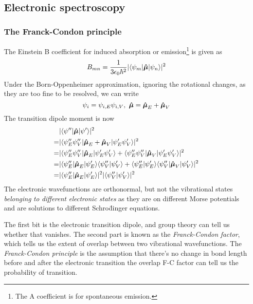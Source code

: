 \subsection{Electronic spectroscopy}

\subsubsection{The Franck-Condon principle}
The Einstein B coefficient for induced absorption or emission\footnote{The A coefficient is for spontaneous emission.} is given as 
\begin{equation}
\label{einsteincoeff}
	B_{mn}=\frac{1}{3\epsilon_0\hbar^2}|\langle \psi_m |\boldsymbol{\hat{\mu}}|\psi_n  \rangle|^2
\end{equation}
Under the Born-Oppenheimer approximation, ignoring the rotational changes, as they are too fine to be resolved, we can write
\begin{equation}
	\psi_i=\psi_{i,E}\psi_{i,V},\ \uvec{\mu}=\uvec{\mu}_E+\uvec{\mu}_V
\end{equation}
The transition dipole moment is now
\begin{equation}
\begin{aligned}
	&|\langle \psi'' |\boldsymbol{\hat{\mu}}|\psi'  \rangle|^2\\
	=&|\langle \psi''_E\psi''_V|\boldsymbol{\hat{\mu}}_E+\boldsymbol{\hat{\mu}}_V |\psi_E'\psi_V'  \rangle |^2\\
	=&|\langle \psi''_E\psi''_V|\boldsymbol{\hat{\mu}}_E|\psi_E'\psi_V'  \rangle+\langle \psi''_E\psi''_V|\boldsymbol{\hat{\mu}}_V|\psi_E'\psi_V'  \rangle |^2\\
	=&|\langle \psi''_E|\boldsymbol{\hat{\mu}}_E|\psi_E'  \rangle \langle \psi''_V | \psi_V' \rangle+ \langle \psi''_E | \psi_E' \rangle \langle \psi''_V|\boldsymbol{\hat{\mu}}_V|\psi_V'  \rangle |^2\\
	=&|\langle \psi''_E|\boldsymbol{\hat{\mu}}_E|\psi_E'  \rangle|^2 |\langle \psi''_V | \psi_V' \rangle|^2
\end{aligned}
\end{equation}
The electronic wavefunctions are orthonormal, but not the vibrational states \emph{belonging to different electronic states} as they are on different Morse potentials and are solutions to different Schro\"dinger equations.\par
The first bit is the electronic transition dipole, and group theory can tell us whether that vanishes. The second part is known as the \emph{Franck-Condon factor}, which tells us the extent of overlap between two vibrational wavefunctions. The \emph{Franck-Condon principle} is the assumption that there's no change in bond length before and after the electronic transition \ie the overlap F-C factor can tell us the probability of transition.
